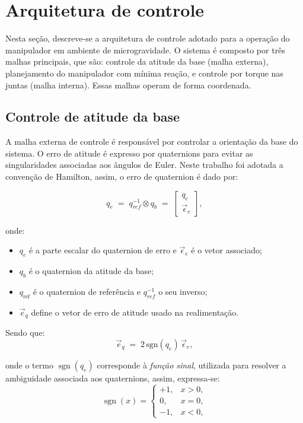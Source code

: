 \section{Arquitetura de controle}
Nesta seção, descreve-se a arquitetura de controle adotado para a operação do manipulador em ambiente de microgravidade. O sistema é composto por três malhas principais, que são: controle da atitude da base (malha externa), planejamento do manipulador com mínima reação, e controle por torque nas juntas (malha interna). Essas malhas operam de forma coordenada.

\subsection{Controle de atitude da base}
A malha externa de controle é responsável por controlar a orientação da base do sistema. O erro de atitude é expresso por quaternions para evitar as singularidades associadas aos ângulos de Euler.
Neste trabalho foi adotada a convenção de Hamilton, assim, o erro de quaternion é dado por:

\begin{equation}
    q_e \;=\; q_{ref}^{-1} \otimes q_b \;=\;
    \begin{bmatrix}
        q_{e} \\[2pt] \vec {\epsilon}_e
    \end{bmatrix},
    \label{eq:erro_quaternion1}
\end{equation}

onde:
\begin{itemize}
    \item $q_{e}$ é a parte escalar do quaternion de erro e $\vec {\epsilon}_e$ é o vetor associado;
    \item $q_b$ é o quaternion da atitude da base;
    \item $q_{\mathrm{ref}}$ é o quaternion de referência e $q_{ref}^{-1}$ o seu inverso;
    \item $\vec e_q$ define o vetor de erro de atitude usado na realimentação.
\end{itemize}

Sendo que:
\begin{equation}
    \vec e_q \;=\; 2\,\mathrm{sgn}(q_{e})\,\vec {\epsilon}_e,
    \label{eq:erro_quaternion2}
\end{equation}

onde o termo $\operatorname{sgn}(q_{e})$ corresponde à \emph{função sinal}, utilizada para resolver a ambiguidade associada aos quaternions, assim, expressa-se:
\begin{equation}
\operatorname{sgn}(x) =
\begin{cases}
+1, & x > 0, \\
0,  & x = 0, \\
-1, & x < 0,
\end{cases}
\label{eq:funcao_sinal}
\end{equation}

